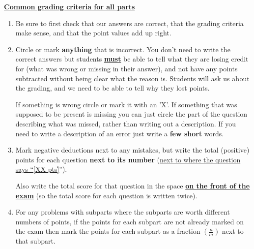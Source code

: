 \documentclass[11pt,fleqn]{article}
\begin{document}

  {

    \begin{info}{\textbf{\underline{\Large Common grading criteria for all
                 parts}}}

      \vspace*{-2mm}

      \enlargethispage{6mm}

      \setlength{\leftmarginii}{5mm}

      \begin{enumerate}

        \addtolength{\itemsep}{.5mm}

        \item Be sure to first check that our answers are correct, that the
              grading criteria make sense, and that the point values add up
              right.

        \item Circle or mark \textbf{anything} that is incorrect.  You don't
              need to write the correct answers but students
              \textbf{\underline{must}} be able to tell what they are losing
              credit for (what was wrong or missing in their answer), and not
              have any points subtracted without being clear what the reason
              is.  Students will ask us about the grading, and we need to be
              able to tell why they lost points.

              If something is wrong circle or mark it with an 'X'.  If
              something that was supposed to be present is missing you can
              just circle the part of the question describing what was missed,
              rather than writing out a description.  If you need to write a
              description of an error just write a \textbf{few short} words.

        \item Mark negative deductions next to any mistakes, but write the
              total (positive) points for each question \textbf{next to its
              number} (\underline{next to where the question says ``[XX
              pts\.]}'').

              Also write the total score for that question in the space
              \textbf{\underline{on the front of the exam}} (so the total
              score for each question is written twice).

        \item For any problems with subparts where the subparts are worth
              different numbers of points, if the points for each subpart
              are not already marked on the exam then mark the points for each
              subpart as a fraction $\left(\frac{n}{m}\right)$ next to that
              subpart.


\end{enumerate}
\end{info}}
\end{document}
